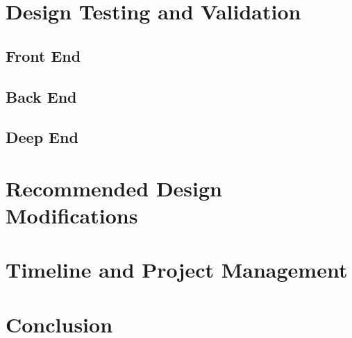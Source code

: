 \documentclass{article}
\begin{document}
\newpage
\section{Design Testing and Validation}

\subsection{Front End}

\subsection{Back End}

\subsection{Deep End}

\newpage
\section{Recommended Design Modifications}

\newpage
\section{Timeline and Project Management}

\newpage
\section{Conclusion}

\newpage
{}




\end{document}

